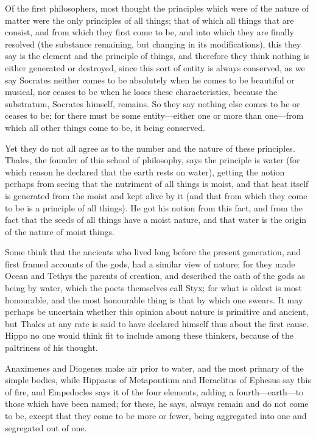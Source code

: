 Of the first philosophers, most thought the principles which were of the nature of matter were the only principles of all things; that of which all things that are consist, and from which they first come to be, and into which they are finally resolved (the substance remaining, but changing in its modifications), this they say is the element and the principle of things, and therefore they think nothing is either generated or destroyed, since this sort of entity is always conserved, as we say Socrates neither comes to be absolutely when he comes to be beautiful or musical, nor ceases to be when he loses these characteristics, because the substratum, Socrates himself, remains. So they say nothing else comes to be or ceases to be; for there must be some entity—either one or more than one—from which all other things come to be, it being conserved.

Yet they do not all agree as to the number and the nature of these principles. Thales, the founder of this school of philosophy, says the principle is water (for which reason he declared that the earth rests on water), getting the notion perhaps from seeing that the nutriment of all things is moist, and that heat itself is generated from the moist and kept alive by it (and that from which they come to be is a principle of all things). He got his notion from this fact, and from the fact that the seeds of all things have a moist nature, and that water is the origin of the nature of moist things.

Some think that the ancients who lived long before the present generation, and first framed accounts of the gods, had a similar view of nature; for they made Ocean and Tethys the parents of creation, and described the oath of the gods as being by water, which the poets themselves call Styx; for what is oldest is most honourable, and the most honourable thing is that by which one swears. It may perhaps be uncertain whether this opinion about nature is primitive and ancient, but Thales at any rate is said to have declared himself thus about the first cause. Hippo no one would think fit to include among these thinkers, because of the paltriness of his thought.

Anaximenes and Diogenes make air prior to water, and the most primary of the simple bodies, while Hippasus of Metapontium and Heraclitus of Ephesus say this of fire, and Empedocles says it of the four elements, adding a fourth—earth—to those which have been named; for these, he says, always remain and do not come to be, except that they come to be more or fewer, being aggregated into one and segregated out of one.

